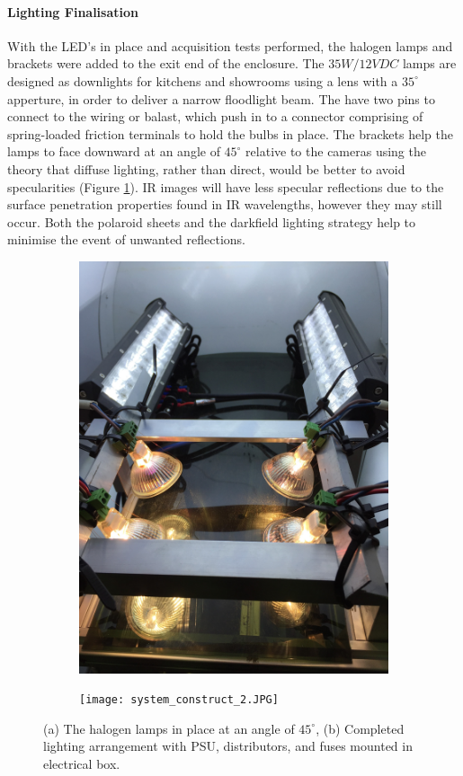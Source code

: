 \documentclass[fleqn,twoside]{article}
\begin{document}
\paragraph{Lighting Finalisation}


With the LED's in place and acquisition tests performed, the halogen lamps and brackets were added to the exit end of the enclosure. The $35W/12VDC$ lamps are designed as downlights for kitchens and showrooms using a lens with a $35^{\circ}$ apperture, in order to deliver a narrow floodlight beam. The have two pins to connect to the wiring or balast, which push in to a connector comprising of spring-loaded friction terminals to hold the bulbs in place. The brackets help the lamps to face downward at an angle of $45^{\circ}$ relative to the cameras using the theory that diffuse lighting, rather than direct, would be better to avoid specularities (Figure \ref{fig:halogen}). IR images will have less specular reflections due to the surface penetration properties found in IR wavelengths, however they may still occur. Both the polaroid sheets and the darkfield lighting strategy help to minimise the event of unwanted reflections.

\begin{figure}[ht]
	\centering
	\begin{subfigure}{.5\textwidth}
		\centering
		\includegraphics[width=.8\linewidth, angle=270]{halogen.jpg}
		\caption{}
		\label{fig:halogen}
	\end{subfigure}%
	\begin{subfigure}{.5\textwidth}
		\centering
		\texttt{[image: system\_construct\_2.JPG]}
		\caption{}
		\label{fig:lights_power}
	\end{subfigure}%

	\caption{(a) The halogen lamps in place at an angle of $45^{\circ}$, (b) Completed lighting arrangement with PSU, distributors, and fuses mounted in electrical box.}
	\label{}
\end{figure}
\end{document}
